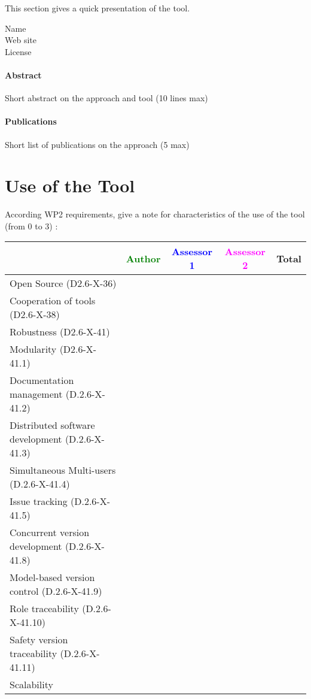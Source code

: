 This section gives a quick presentation of the tool.

\begin{description}
\item[Name] 
\item[Web site] 
\item[License] 
\end{description}

\paragraph{Abstract} Short abstract on the approach and tool (10 lines max)

\paragraph{Publications} Short list of publications on the approach (5 max)

\section{Use of the Tool}
According WP2 requirements, give a note for characteristics of the use of the tool (from 0 to 3) :

\begin{tabular}{|l | c | c | c | c|}
\hline
& \textcolor{green}{Author} & \textcolor{blue}{Assessor 1} & \textcolor{magenta}{Assessor 2} & Total \\
\hline 
Open Source (D2.6-X-36) & & & &  \\
\hline 
Cooperation of tools (D2.6-X-38) & & & &  \\
\hline
Robustness (D2.6-X-41) & & & & \\
\hline
Modularity (D2.6-X-41.1) & & & & \\
\hline
Documentation management (D.2.6-X-41.2) & & & & \\
\hline
Distributed software development (D.2.6-X-41.3)  & & & & \\
\hline
Simultaneous Multi-users (D.2.6-X-41.4)   & & & & \\
\hline
Issue tracking (D.2.6-X-41.5) & & & & \\
\hline
Concurrent version development (D.2.6-X-41.8) & & & & \\
\hline
Model-based version control (D.2.6-X-41.9) & & & & \\
\hline
Role traceability (D.2.6-X-41.10) & & & & \\
\hline
Safety version traceability (D.2.6-X-41.11) & & & & \\
\hline
Scalability & & & & \\
\hline
\end{tabular}


